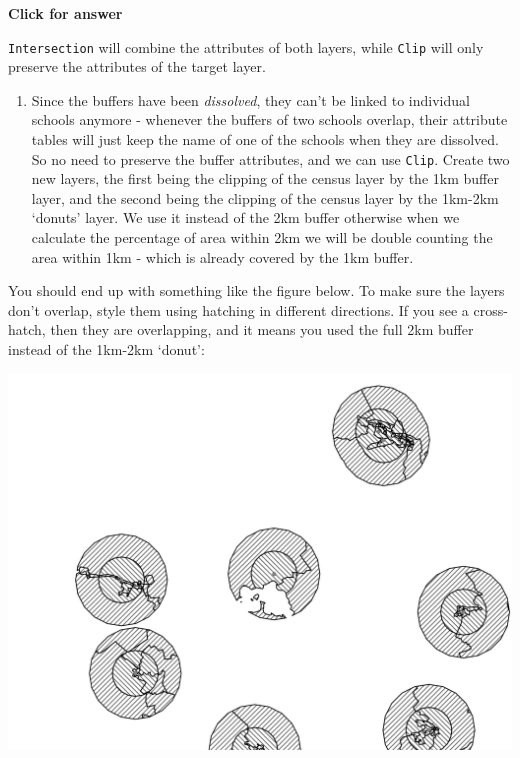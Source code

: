 \documentclass[
  letterpaper,
  DIV=11,
  numbers=noendperiod]{scrreprt}
\providecommand{\tightlist}{%
  \setlength{\itemsep}{0pt}\setlength{\parskip}{0pt}}\usepackage{longtable,booktabs,array}
\begin{document}
\begin{tcolorbox}[enhanced jigsaw, toprule=.15mm, breakable, left=2mm, colframe=quarto-callout-important-color-frame, colback=white, arc=.35mm, leftrule=.75mm, opacityback=0, rightrule=.15mm, bottomrule=.15mm]

\vspace{-3mm}\textbf{Click for answer}\vspace{3mm}

\texttt{Intersection} will combine the attributes of both layers, while
\texttt{Clip} will only preserve the attributes of the target layer.

\end{tcolorbox}

\begin{enumerate}
\def\labelenumi{(\arabic{enumi})}
\setcounter{enumi}{294}
\tightlist
\item
  Since the buffers have been \emph{dissolved}, they can't be linked to
  individual schools anymore - whenever the buffers of two schools
  overlap, their attribute tables will just keep the name of one of the
  schools when they are dissolved. So no need to preserve the buffer
  attributes, and we can use \texttt{Clip}. Create two new layers, the
  first being the clipping of the census layer by the 1km buffer layer,
  and the second being the clipping of the census layer by the 1km-2km
  `donuts' layer. We use it instead of the 2km buffer otherwise when we
  calculate the percentage of area within 2km we will be double counting
  the area within 1km - which is already covered by the 1km buffer.
\end{enumerate}

You should end up with something like the figure below. To make sure the
layers don't overlap, style them using hatching in different directions.
If you see a cross-hatch, then they are overlapping, and it means you
used the full 2km buffer instead of the 1km-2km `donut':

\includegraphics{images/lab_geoprocessing/fig4_clipped_buffers.png}
\end{document}
